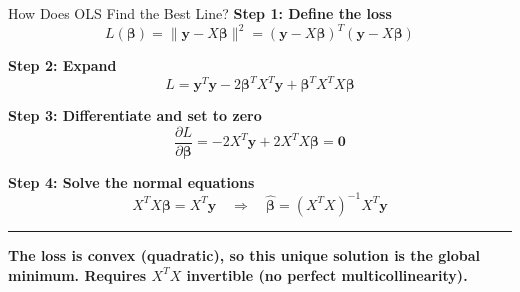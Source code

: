 \documentclass[8pt,aspectratio=169]{beamer}
\newcommand{\bottomnote}[1]{%
\vfill
\vspace{-2mm}
\textcolor{mllavender2}{\rule{\textwidth}{0.4pt}}
\vspace{1mm}
\footnotesize
\textbf{#1}
}
\begin{document}
\begin{frame}[t]{How Does OLS Find the Best Line?}
\small
\textbf{Step 1: Define the loss}
\vspace{-1mm}
\[L(\boldsymbol{\beta}) = \|\mathbf{y} - X\boldsymbol{\beta}\|^2 = (\mathbf{y} - X\boldsymbol{\beta})^T(\mathbf{y} - X\boldsymbol{\beta})\]

\textbf{Step 2: Expand}
\vspace{-1mm}
\[L = \mathbf{y}^T\mathbf{y} - 2\boldsymbol{\beta}^TX^T\mathbf{y} + \boldsymbol{\beta}^TX^TX\boldsymbol{\beta}\]

\textbf{Step 3: Differentiate and set to zero}
\vspace{-1mm}
\[\frac{\partial L}{\partial \boldsymbol{\beta}} = -2X^T\mathbf{y} + 2X^TX\boldsymbol{\beta} = \mathbf{0}\]

\textbf{Step 4: Solve the normal equations}
\vspace{-1mm}
\[X^TX\boldsymbol{\beta} = X^T\mathbf{y} \quad \Longrightarrow \quad \boxed{\hat{\boldsymbol{\beta}} = (X^TX)^{-1}X^T\mathbf{y}}\]

\bottomnote{The loss is convex (quadratic), so this unique solution is the global minimum. Requires $X^TX$ invertible (no perfect multicollinearity).}
\end{frame}
\end{document}
